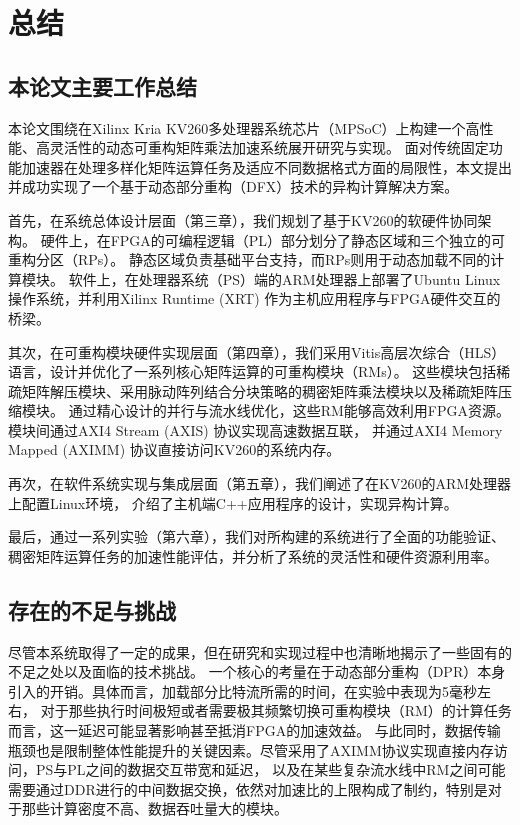 \chapter{总结}

\section{本论文主要工作总结}

本论文围绕在Xilinx Kria KV260多处理器系统芯片（MPSoC）上构建一个高性能、高灵活性的动态可重构矩阵乘法加速系统展开研究与实现。
面对传统固定功能加速器在处理多样化矩阵运算任务及适应不同数据格式方面的局限性，本文提出并成功实现了一个基于动态部分重构（DFX）技术的异构计算解决方案。

首先，在系统总体设计层面（第三章），我们规划了基于KV260的软硬件协同架构。
硬件上，在FPGA的可编程逻辑（PL）部分划分了静态区域和三个独立的可重构分区（RPs）。
静态区域负责基础平台支持，而RPs则用于动态加载不同的计算模块。
软件上，在处理器系统（PS）端的ARM处理器上部署了Ubuntu Linux操作系统，并利用Xilinx Runtime (XRT) 作为主机应用程序与FPGA硬件交互的桥梁。

其次，在可重构模块硬件实现层面（第四章），我们采用Vitis高层次综合（HLS）语言，设计并优化了一系列核心矩阵运算的可重构模块（RMs）。
这些模块包括稀疏矩阵解压模块、采用脉动阵列结合分块策略的稠密矩阵乘法模块以及稀疏矩阵压缩模块。
通过精心设计的并行与流水线优化，这些RM能够高效利用FPGA资源。模块间通过AXI4 Stream (AXIS) 协议实现高速数据互联，
并通过AXI4 Memory Mapped (AXIMM) 协议直接访问KV260的系统内存。

再次，在软件系统实现与集成层面（第五章），我们阐述了在KV260的ARM处理器上配置Linux环境，
介绍了主机端C++应用程序的设计，实现异构计算。

最后，通过一系列实验（第六章），我们对所构建的系统进行了全面的功能验证、
稠密矩阵运算任务的加速性能评估，并分析了系统的灵活性和硬件资源利用率。

\section{存在的不足与挑战}

尽管本系统取得了一定的成果，但在研究和实现过程中也清晰地揭示了一些固有的不足之处以及面临的技术挑战。
一个核心的考量在于动态部分重构（DPR）本身引入的开销。具体而言，加载部分比特流所需的时间，在实验中表现为5毫秒左右，
对于那些执行时间极短或者需要极其频繁切换可重构模块（RM）的计算任务而言，这一延迟可能显著影响甚至抵消FPGA的加速效益。
与此同时，数据传输瓶颈也是限制整体性能提升的关键因素。尽管采用了AXIMM协议实现直接内存访问，PS与PL之间的数据交互带宽和延迟，
以及在某些复杂流水线中RM之间可能需要通过DDR进行的中间数据交换，依然对加速比的上限构成了制约，特别是对于那些计算密度不高、数据吞吐量大的模块。

